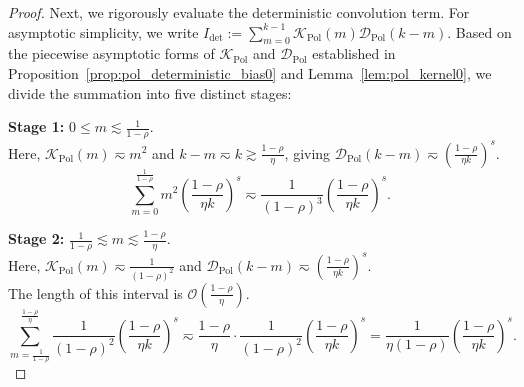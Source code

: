 \begin{proof}
Next, we rigorously evaluate the deterministic convolution term. For asymptotic simplicity, we write $I_{\mathrm{det}} := \sum_{m=0}^{k-1} \mathcal K_{\mathrm{Pol}}(m)\mathcal D_{\mathrm{Pol}}(k-m)$. Based on the piecewise asymptotic forms of $\mathcal K_{\mathrm{Pol}}$ and $\mathcal D_{\mathrm{Pol}}$ established in Proposition~\ref{prop:pol_deterministic_bias0} and Lemma~\ref{lem:pol_kernel0}, we divide the summation into five distinct stages:

\textbf{Stage 1:} $0 \le m \lesssim \frac{1}{1-\rho}$. \\
Here, $\mathcal K_{\mathrm{Pol}}(m) \eqsim m^2$ and $k-m \eqsim k \gtrsim \frac{1-\rho}{\eta}$, giving $\mathcal D_{\mathrm{Pol}}(k-m) \eqsim \left(\frac{1-\rho}{\eta k}\right)^s$.
\[
    \sum_{m=0}^{\frac{1}{1-\rho}} m^2 \left(\frac{1-\rho}{\eta k}\right)^s \eqsim \frac{1}{(1-\rho)^3} \left(\frac{1-\rho}{\eta k}\right)^s.
\]

\textbf{Stage 2:} $\frac{1}{1-\rho} \lesssim m \lesssim \frac{1-\rho}{\eta}$. \\
Here, $\mathcal K_{\mathrm{Pol}}(m) \eqsim \frac{1}{(1-\rho)^2}$ and $\mathcal D_{\mathrm{Pol}}(k-m) \eqsim \left(\frac{1-\rho}{\eta k}\right)^s$. \\
The length of this interval is $\mathcal{O}(\frac{1-\rho}{\eta})$.
\[
    \sum_{m=\frac{1}{1-\rho}}^{\frac{1-\rho}{\eta}} \frac{1}{(1-\rho)^2} \left(\frac{1-\rho}{\eta k}\right)^s \eqsim \frac{1-\rho}{\eta} \cdot \frac{1}{(1-\rho)^2} \left(\frac{1-\rho}{\eta k}\right)^s = \frac{1}{\eta(1-\rho)} \left(\frac{1-\rho}{\eta k}\right)^s.
\]


\end{proof}
